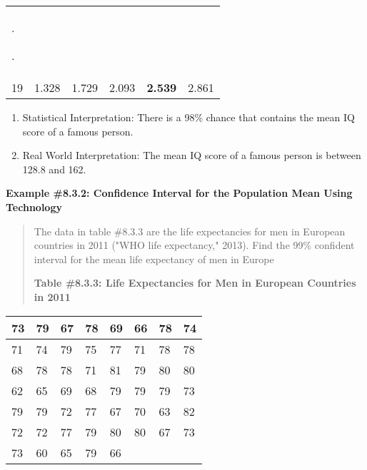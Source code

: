 \documentclass[]{book}
\begin{document}
\begin{longtable}[]{@{}llllll@{}}
\begin{minipage}[t]{0.10\columnwidth}
.

.\strut
\end{minipage}\tabularnewline
\begin{minipage}[t]{0.32\columnwidth}\raggedright
19\strut
\end{minipage} & \begin{minipage}[t]{0.09\columnwidth}\raggedright
1.328\strut
\end{minipage} & \begin{minipage}[t]{0.09\columnwidth}\raggedright
1.729\strut
\end{minipage} & \begin{minipage}[t]{0.10\columnwidth}\raggedright
2.093\strut
\end{minipage} & \begin{minipage}[t]{0.14\columnwidth}\raggedright
\textbf{2.539}\strut
\end{minipage} & \begin{minipage}[t]{0.10\columnwidth}\raggedright
2.861\strut
\end{minipage}\tabularnewline
\bottomrule
\end{longtable}

\begin{enumerate}
\def\labelenumi{\arabic{enumi}.}
\setcounter{enumi}{3}
\item
  Statistical Interpretation: There is a 98\% chance that contains the
  mean IQ score of a famous person.
\item
  Real World Interpretation: The mean IQ score of a famous person is
  between 128.8 and 162.
\end{enumerate}

\textbf{Example \#8.3.2: Confidence Interval for the Population Mean Using
Technology}

\begin{quote}
The data in table \#8.3.3 are the life expectancies for men in
European countries in 2011 ("WHO life expectancy," 2013). Find the
99\% confident interval for the mean life expectancy of men in Europe

\textbf{Table \#8.3.3: Life Expectancies for Men in European Countries in
2011}
\end{quote}

\begin{longtable}[]{@{}llllllll@{}}
\toprule
73 & 79 & 67 & 78 & 69 & 66 & 78 & 74\tabularnewline
\midrule
\endhead
71 & 74 & 79 & 75 & 77 & 71 & 78 & 78\tabularnewline
68 & 78 & 78 & 71 & 81 & 79 & 80 & 80\tabularnewline
62 & 65 & 69 & 68 & 79 & 79 & 79 & 73\tabularnewline
79 & 79 & 72 & 77 & 67 & 70 & 63 & 82\tabularnewline
72 & 72 & 77 & 79 & 80 & 80 & 67 & 73\tabularnewline
73 & 60 & 65 & 79 & 66 & & &\tabularnewline
\bottomrule
\end{longtable}
\end{document}
